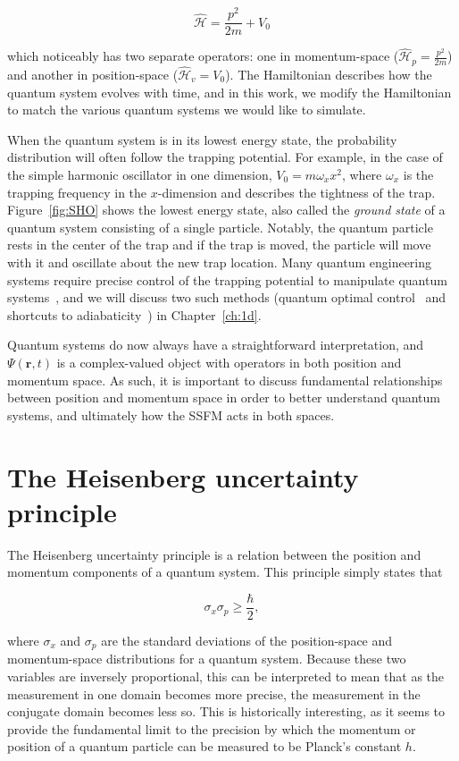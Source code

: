 \begin{equation}
\mathcal{\hat H} = \frac{p^2}{2m} + V_0
\end{equation}

\noindent which noticeably has two separate operators: one in momentum-space ($\mathcal{\hat H}_p = \frac{p^2}{2m}$) and another in position-space ($\mathcal{\hat H}_v = V_0$).
The Hamiltonian describes how the quantum system evolves with time, and in this work, we modify the Hamiltonian to match the various quantum systems we would like to simulate.

When the quantum system is in its lowest energy state, the probability distribution will often follow the trapping potential.
For example, in the case of the simple harmonic oscillator in one dimension, $V_0 = m \omega_x x^2$, where $\omega_x$ is the trapping frequency in the $x$-dimension and describes the tightness of the trap.
Figure~\ref{fig:SHO} shows the lowest energy state, also called the \textit{ground state} of a quantum system consisting of a single particle.
Notably, the quantum particle rests in the center of the trap and if the trap is moved, the particle will move with it and oscillate about the new trap location.
Many quantum engineering systems require precise control of the trapping potential to manipulate quantum systems~\cite{menchon2016}, and we will discuss two such methods (quantum optimal control~\cite{werschnik2007} and shortcuts to adiabaticity~\cite{guery2019}) in Chapter~\ref{ch:1d}.

Quantum systems do now always have a straightforward interpretation, and $\Psi(\mathbf{r},t)$ is a complex-valued object with operators in both position and momentum space.
As such, it is important to discuss fundamental relationships between position and momentum space in order to better understand quantum systems, and ultimately how the SSFM acts in both spaces.

\section{The Heisenberg uncertainty principle}


The Heisenberg uncertainty principle is a relation between the position and momentum components of a quantum system.
This principle simply states that

$$
\sigma_x \sigma_p \geq \frac{\hbar}{2},
$$

where $\sigma_x$ and $\sigma_p$ are the standard deviations of the position-space and momentum-space distributions for a quantum system.
Because these two variables are inversely proportional, this can be interpreted to mean that as the measurement in one domain becomes more precise, the measurement in the conjugate domain becomes less so.
This is historically interesting, as it seems to provide the fundamental limit to the precision by which the momentum or position of a quantum particle can be measured to be Planck's constant $h$.

